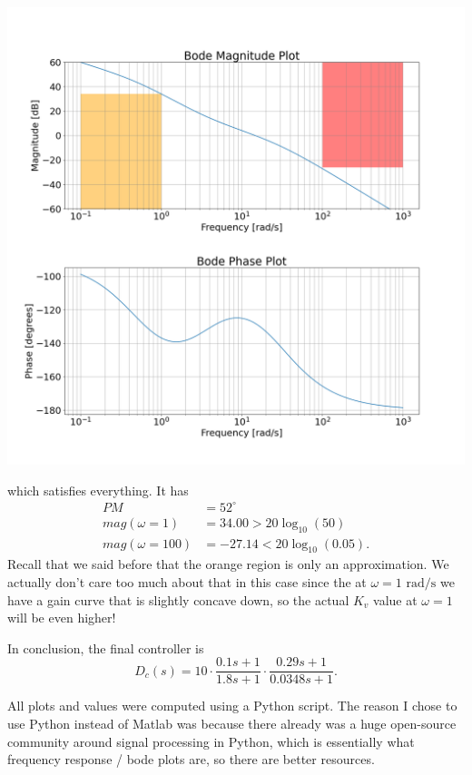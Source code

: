\documentclass{article}
\begin{document}
\begin{enumerate}[label=\textbf{4.\arabic*}]
\begin{enumerate}[label=(\alph*)]
    \begin{center}
        \includegraphics[width=\linewidth]{A4_imgs/q5_bode_d_3.png}
    \end{center}
    which satisfies everything. It has 
    \begin{align}
        PM &=52^\circ \\ 
        mag(\omega=1) &= 34.00 > 20\log_{10}(50) \\ 
        mag(\omega=100) &= -27.14 < 20\log_{10}(0.05).
    \end{align}
    Recall that we said before that the orange region is only an approximation. We actually don't care too much about that in this case since the at $\omega= 1\text{ rad/s}$ we have a gain curve that is slightly concave down, so the actual $K_v$ value at $\omega=1$ will be even higher!

    In conclusion, the final controller is 
    \begin{equation}
        D_c(s) = 10 \cdot \frac{0.1s+1}{1.8s + 1} \cdot \frac{0.29s + 1}{0.0348s + 1}.
    \end{equation}
\end{enumerate}
\end{enumerate}
\appendix
All plots and values were computed using a Python script. The reason I chose to use Python instead of Matlab was because there already was a huge open-source community around signal processing in Python, which is essentially what frequency response / bode plots are, so there are better resources.
\end{document}
